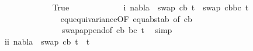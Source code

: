 \begin{isabellebody}
\ \ \ \ \ \ \ \ \ \ \ \isamarkupfalse%
\ True\isanewline
\ \ \ \ \ \ \ \ \ \ \ \isamarkupfalse%
\ i{\isacharcolon}{\kern0pt}\ {\isachardoublequoteopen}nabla\ {\isasymturnstile}\ swap\ {\isacharbrackleft}{\kern0pt}{\isacharparenleft}{\kern0pt}c{\isacharcomma}{\kern0pt}b{\isacharparenright}{\kern0pt}{\isacharbrackright}{\kern0pt}\ t{}{\isacharprime}{\kern0pt}\ {\isasymapprox}\ swap\ {\isacharparenleft}{\kern0pt}{\isacharbrackleft}{\kern0pt}{\isacharparenleft}{\kern0pt}c{\isacharcomma}{\kern0pt}b{\isacharparenright}{\kern0pt}{\isacharbrackright}{\kern0pt}{\isacharat}{\kern0pt}{\isacharbrackleft}{\kern0pt}{\isacharparenleft}{\kern0pt}b{\isacharcomma}{\kern0pt}c{\isacharparenright}{\kern0pt}{\isacharbrackright}{\kern0pt}{\isacharparenright}{\kern0pt}\ t{}{\isacharprime}{\kern0pt}{\isachardoublequoteclose}\isanewline
\ \ \ \ \ \ \ \ \ \ \ \ \ \isamarkupfalse%
\ equ{\isacharunderscore}{\kern0pt}equivariance{\isacharbrackleft}{\kern0pt}OF\ equ{\isacharunderscore}{\kern0pt}abst{\isacharunderscore}{\kern0pt}ab{\isacharparenleft}{\kern0pt}{}{\isacharparenright}{\kern0pt}{\isacharcomma}{\kern0pt}\ of\ {\isacartoucheopen}{\isacharbrackleft}{\kern0pt}{\isacharparenleft}{\kern0pt}c{\isacharcomma}{\kern0pt}b{\isacharparenright}{\kern0pt}{\isacharbrackright}{\kern0pt}{\isacartoucheclose}{\isacharbrackright}{\kern0pt}\ {}{\isacharparenleft}{\kern0pt}{}{\isacharparenright}{\kern0pt}\isanewline
\ \ \ \ \ \ \ \ \ \ \ \ \ \ \ swap{\isacharunderscore}{\kern0pt}append{\isacharbrackleft}{\kern0pt}of\ {\isacartoucheopen}{\isacharbrackleft}{\kern0pt}{\isacharparenleft}{\kern0pt}c{\isacharcomma}{\kern0pt}b{\isacharparenright}{\kern0pt}{\isacharbrackright}{\kern0pt}{\isacartoucheclose}\ {\isacartoucheopen}{\isacharbrackleft}{\kern0pt}{\isacharparenleft}{\kern0pt}b{\isacharcomma}{\kern0pt}c{\isacharparenright}{\kern0pt}{\isacharbrackright}{\kern0pt}{\isacartoucheclose}\ t{}{\isacharprime}{\kern0pt}{\isacharbrackright}{\kern0pt}\ \isamarkupfalse%
\ simp\isanewline
\ \ \ \ \ \ \ \ \ \ \ \isamarkupfalse%
\ ii{\isacharcolon}{\kern0pt}\ {\isachardoublequoteopen}nabla\ {\isasymturnstile}\ swap\ {\isacharbrackleft}{\kern0pt}{\isacharparenleft}{\kern0pt}c{\isacharcomma}{\kern0pt}b{\isacharparenright}{\kern0pt}{\isacharbrackright}{\kern0pt}\ t{}{\isacharprime}{\kern0pt}\ {\isasymapprox}\ t{}{\isacharprime}{\kern0pt}{\isachardoublequoteclose}\isanewline
\ \ \ \ \ \ \ \ \ \ \ \ \ \isamarkupfalse%

\end{isabellebody}
